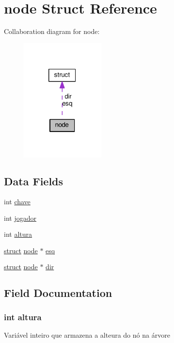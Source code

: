 \hypertarget{structnode}{}\section{node Struct Reference}
\label{structnode}


Collaboration diagram for node\+:\nopagebreak
\begin{figure}[H]
\begin{center}
\leavevmode
\includegraphics[width=121pt]{structnode__coll__graph}
\end{center}
\end{figure}
\subsection*{Data Fields}
\begin{DoxyCompactItemize}
\item 
int \hyperlink{structnode_a4a9a339d4d22e3b9e5fd31964220a195}{chave}
\item 
int \hyperlink{structnode_adff0ea2ada1722208aa1c811d1019d39}{jogador}
\item 
int \hyperlink{structnode_a778b6b04a3f5e4401e90b192cb05b557}{altura}
\item 
\hyperlink{structstruct}{struct} \hyperlink{structnode}{node} $\ast$ \hyperlink{structnode_a2d0c3d7f54adedaa369899f4df5a4b6a}{esq}
\item 
\hyperlink{structstruct}{struct} \hyperlink{structnode}{node} $\ast$ \hyperlink{structnode_aa053c9a92b1215050c3f9d90646dd612}{dir}
\end{DoxyCompactItemize}


\subsection{Field Documentation}
\subsubsection[{\texorpdfstring{altura}{altura}}]{\setlength{\rightskip}{0pt plus 5cm}int altura}\hypertarget{structnode_a778b6b04a3f5e4401e90b192cb05b557}{}\label{structnode_a778b6b04a3f5e4401e90b192cb05b557}
Variável inteiro que armazena a alteura do nó na árvore 
